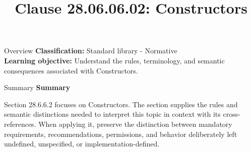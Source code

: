 \documentclass[10pt,letterpaper]{article}
\title{Clause 28.06.06.02: Constructors}
\author{}
\date{}
\begin{document}
\maketitle
\begin{CornellOverviewBox}{Overview}
\textbf{Classification:} Standard library - Normative\\[2pt]
\textbf{Learning objective:} Understand the rules, terminology, and semantic consequences associated with Constructors.
\end{CornellOverviewBox}\begin{CornellSummaryBox}{Summary}
{\sffamily\bfseries\color{Accent} Summary}\par\vspace{3pt}Section 28.6.6.2 focuses on Constructors. The section supplies the rules and semantic distinctions needed to interpret this topic in context with its cross-references. When applying it, preserve the distinction between mandatory requirements, recommendations, permissions, and behavior deliberately left undefined, unspecified, or implementation-defined.
\end{CornellSummaryBox}
\end{document}
